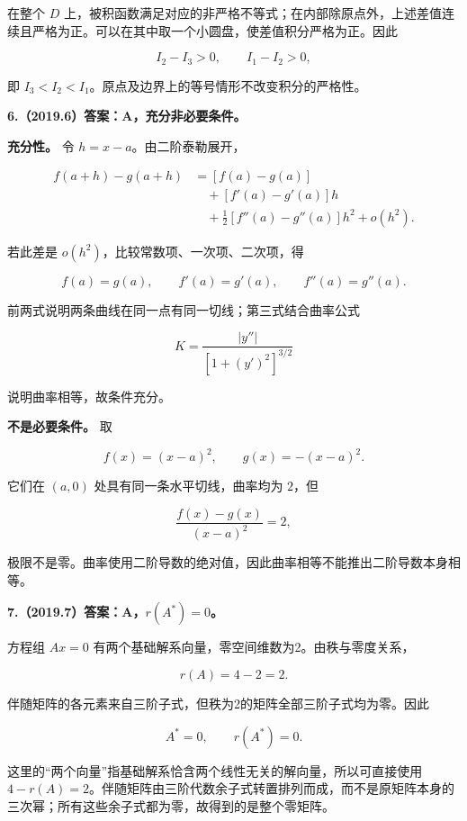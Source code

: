 \documentclass[UTF8,11pt,fontset=windows]{ctexart}
\begin{document}
在整个 $D$ 上，被积函数满足对应的非严格不等式；在内部除原点外，上述差值连续且严格为正。可以在其中取一个小圆盘，使差值积分严格为正。因此

$$
I_2-I_3>0,\qquad I_1-I_2>0,
$$

即 $\boxed{I_3<I_2<I_1}$。原点及边界上的等号情形不改变积分的严格性。

\clearpage

\textbf{6.（2019.6）答案：A，充分非必要条件。}

\textbf{充分性。} 令 $h=x-a$。由二阶泰勒展开，

$$
\begin{aligned}
f(a+h)-g(a+h)
&=[f(a)-g(a)]\\
&\quad+[f'(a)-g'(a)]h\\
&\quad+\frac12[f''(a)-g''(a)]h^2+o(h^2).
\end{aligned}
$$

若此差是 $o(h^2)$，比较常数项、一次项、二次项，得

$$
f(a)=g(a),\qquad f'(a)=g'(a),\qquad f''(a)=g''(a).
$$

前两式说明两条曲线在同一点有同一切线；第三式结合曲率公式

$$
K=\frac{|y''|}{[1+(y')^2]^{3/2}}
$$

说明曲率相等，故条件充分。

\textbf{不是必要条件。} 取

$$
f(x)=(x-a)^2,\qquad g(x)=-(x-a)^2.
$$

它们在 $(a,0)$ 处具有同一条水平切线，曲率均为 $2$，但

$$
\frac{f(x)-g(x)}{(x-a)^2}=2,
$$

极限不是零。曲率使用二阶导数的绝对值，因此曲率相等不能推出二阶导数本身相等。

\clearpage

\textbf{7.（2019.7）答案：A，$r(A^*)=0$。}

方程组 $Ax=0$ 有两个基础解系向量，零空间维数为2。由秩与零度关系，

$$
r(A)=4-2=2.
$$

伴随矩阵的各元素来自三阶子式，但秩为2的矩阵全部三阶子式均为零。因此

$$
A^*=0,
\qquad r(A^*)=0.
$$

这里的“两个向量”指基础解系恰含两个线性无关的解向量，所以可直接使用 $4-r(A)=2$。伴随矩阵由三阶代数余子式转置排列而成，而不是原矩阵本身的三次幂；所有这些余子式都为零，故得到的是整个零矩阵。
\end{document}
